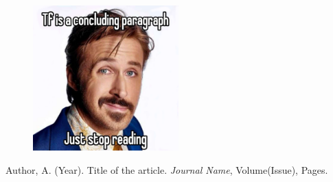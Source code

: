 \documentclass{article}
\begin{document}
	\begin{figure}[h]
		\centering
		\includegraphics[width=0.5\textwidth]{gosling.png}
		
		\label{fig:gosling}
	\end{figure}
	

	\begin{thebibliography}{9}
		Author, A. (Year). Title of the article. \textit{Journal Name}, Volume(Issue), Pages.
	\end{thebibliography}
\end{document}
